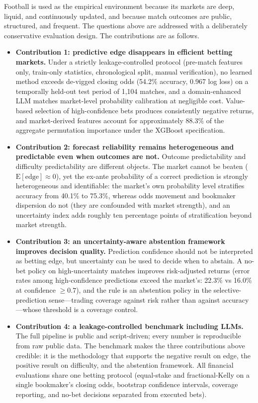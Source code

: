 Football is used as the empirical environment because its markets
are deep, liquid, and continuously updated, and because match
outcomes are public, structured, and frequent. The questions above
are addressed with a deliberately conservative evaluation design.
The contributions are as follows.

\begin{itemize}
\item \textbf{Contribution 1: predictive edge disappears in
efficient betting markets.} Under a strictly leakage-controlled
protocol (pre-match features only, train-only statistics,
chronological split, manual verification), no learned method exceeds
de-vigged closing odds (54.2\% accuracy, 0.967 log loss) on a
temporally held-out test period of 1,104 matches, and a
domain-enhanced LLM matches market-level probability calibration at
negligible cost. Value-based selection of high-confidence bets
produces consistently negative returns, and market-derived features
account for approximately 88.3\% of the aggregate permutation
importance under the XGBoost specification.
\item \textbf{Contribution 2: forecast reliability remains
heterogeneous and predictable even when outcomes are not.}
Outcome predictability and difficulty predictability are different
objects. The market cannot be beaten ($\mathrm{E}[\mathrm{edge}]
\approx 0$), yet the ex-ante probability of a correct prediction is
strongly heterogeneous and identifiable: the market's own probability
level stratifies accuracy from 40.1\% to 75.3\%, whereas odds
movement and bookmaker dispersion do not (they are confounded with
market strength), and an uncertainty index adds roughly ten
percentage points of stratification beyond market strength.
\item \textbf{Contribution 3: an uncertainty-aware abstention
framework improves decision quality.} Prediction confidence should
not be interpreted as betting edge, but uncertainty can be used to
decide when to abstain. A no-bet policy on high-uncertainty matches
improves risk-adjusted returns (error rates among high-confidence
predictions exceed the market's: 22.3\% vs 16.0\% at confidence
$\geq 0.7$), and the rule is an abstention policy in the
selective-prediction sense---trading coverage against risk rather
than against accuracy---whose threshold is a coverage control.
\item \textbf{Contribution 4: a leakage-controlled benchmark
including LLMs.} The full pipeline is public and script-driven; every
number is reproducible from raw public data. The benchmark makes the
three contributions above credible: it is the methodology that
supports the negative result on edge, the positive result on
difficulty, and the abstention framework. All financial evaluations
share one betting protocol (equal-stake and fractional-Kelly on a
single bookmaker's closing odds, bootstrap confidence intervals,
coverage reporting, and no-bet decisions separated from executed
bets).
\end{itemize}

